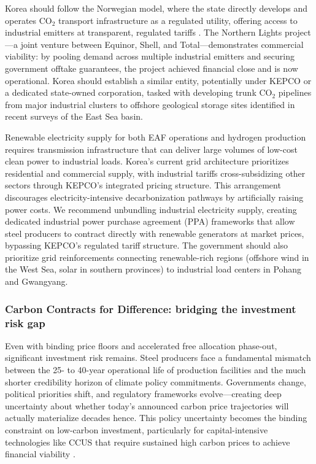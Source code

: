 \documentclass[preprint,1p,authoryear]{elsarticle}
\begin{document}
Korea should follow the Norwegian model, where the state directly develops and operates CO$_2$ transport infrastructure as a regulated utility, offering access to industrial emitters at transparent, regulated tariffs \citep{IEA2020steel}. The Northern Lights project—a joint venture between Equinor, Shell, and Total—demonstrates commercial viability: by pooling demand across multiple industrial emitters and securing government offtake guarantees, the project achieved financial close and is now operational. Korea should establish a similar entity, potentially under KEPCO or a dedicated state-owned corporation, tasked with developing trunk CO$_2$ pipelines from major industrial clusters to offshore geological storage sites identified in recent surveys of the East Sea basin.

Renewable electricity supply for both EAF operations and hydrogen production requires transmission infrastructure that can deliver large volumes of low-cost clean power to industrial loads. Korea's current grid architecture prioritizes residential and commercial supply, with industrial tariffs cross-subsidizing other sectors through KEPCO's integrated pricing structure. This arrangement discourages electricity-intensive decarbonization pathways by artificially raising power costs. We recommend unbundling industrial electricity supply, creating dedicated industrial power purchase agreement (PPA) frameworks that allow steel producers to contract directly with renewable generators at market prices, bypassing KEPCO's regulated tariff structure. The government should also prioritize grid reinforcements connecting renewable-rich regions (offshore wind in the West Sea, solar in southern provinces) to industrial load centers in Pohang and Gwangyang.

\subsubsection{Carbon Contracts for Difference: bridging the investment risk gap}

Even with binding price floors and accelerated free allocation phase-out, significant investment risk remains. Steel producers face a fundamental mismatch between the 25- to 40-year operational life of production facilities and the much shorter credibility horizon of climate policy commitments. Governments change, political priorities shift, and regulatory frameworks evolve—creating deep uncertainty about whether today's announced carbon price trajectories will actually materialize decades hence. This policy uncertainty becomes the binding constraint on low-carbon investment, particularly for capital-intensive technologies like CCUS that require sustained high carbon prices to achieve financial viability \citep{Neuhoff2019CCfD}.
\end{document}
